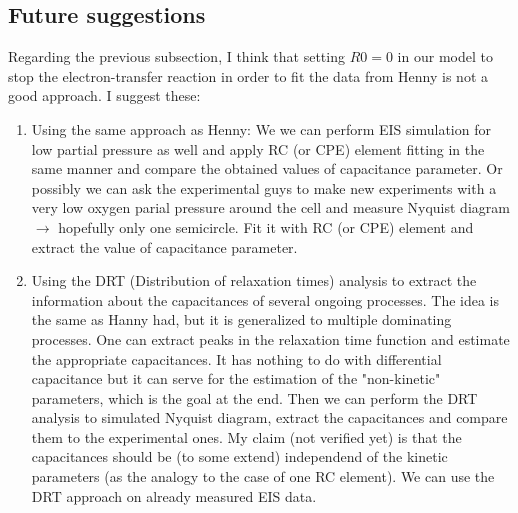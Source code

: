 \documentclass[a4 paper]{article}
\begin{document}
\subsection{Future suggestions}
Regarding the previous subsection, I think that setting $R0 = 0$ in our model to stop the electron-transfer reaction in order to fit the data from Henny is not a good approach. I suggest these:
\begin{enumerate}
\item Using the same approach as Henny: We we can perform EIS simulation for low partial pressure as well and apply RC (or CPE) element fitting in the same manner and compare the obtained values of capacitance parameter. Or possibly we can ask the experimental guys to make new experiments with a very low oxygen parial pressure around the cell and measure Nyquist diagram  $\rightarrow$ hopefully only one semicircle. Fit it with RC (or CPE) element and extract the value of capacitance parameter.

\item Using the DRT (Distribution of relaxation times) analysis to extract the information about the capacitances of several ongoing processes. The idea is the same as Hanny had, but it is generalized to multiple dominating processes. One can extract peaks in the relaxation time function and estimate the appropriate capacitances. It has nothing to do with differential capacitance but it can serve for the estimation of the "non-kinetic" parameters, which is the goal at the end. Then we can perform the DRT analysis to simulated Nyquist diagram, extract the capacitances and compare them to the experimental ones. My claim (not verified yet) is that the capacitances should be (to some extend) independend of the kinetic parameters (as the analogy to the case of one RC element). We can use the DRT approach on already measured EIS data.
\end{enumerate}
\end{document}
